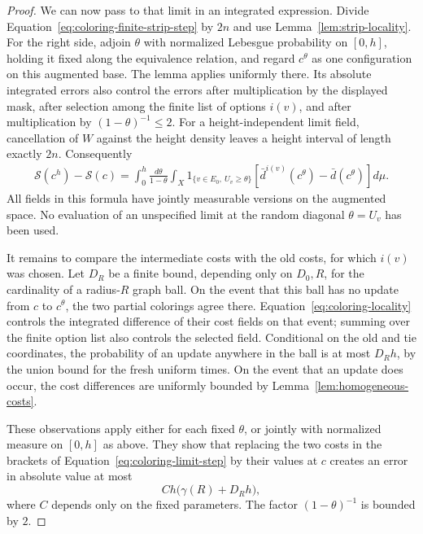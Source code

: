 \begin{proof}
We can now pass to that limit in an integrated expression.  Divide
Equation~\eqref{eq:coloring-finite-strip-step} by $2n$ and use
Lemma~\ref{lem:strip-locality}.  For the right side, adjoin $\theta$ with
normalized Lebesgue probability on $[0,h]$, holding it fixed along the
equivalence relation, and regard $c^\theta$ as one configuration on this
augmented base.  The lemma applies uniformly there.  Its absolute
integrated errors also control the errors after multiplication by the
displayed mask, after selection among the finite list of options
$i(v)$, and after multiplication by $(1-\theta)^{-1}\leq2$.
For a height-independent limit field, cancellation of $W$ against the
height density leaves a height interval of length exactly $2n$.
Consequently
\begin{equation}
 \begin{split}
 \mathcal S(c^h)-\mathcal S(c)
    =\int_0^h\frac{d\theta}{1-\theta}
      \int_X1_{\{v\in E_0,\ U_v\geq\theta\}}
       \left[
        \bar d^{i(v)}(c^\theta)-\bar d(c^\theta)
       \right]d\mu.
 \end{split}
 \label{eq:coloring-limit-step}
\end{equation}
All fields in this formula have jointly measurable versions on the
augmented space.  No evaluation of an unspecified limit at the random
diagonal $\theta=U_v$ has been used.

It remains to compare the intermediate costs with the old costs, for
which $i(v)$ was chosen.  Let $D_R$ be a finite bound, depending only on
$D_0,R$, for the cardinality of a radius-$R$ graph ball.  On the event
that this ball has no update from $c$ to $c^\theta$, the two partial
colorings agree there.  Equation~\eqref{eq:coloring-locality} controls the
integrated difference of their cost fields on that event; summing over
the finite option list also controls the selected field.  Conditional
on the old and tie coordinates, the probability of an update anywhere
in the ball is at most $D_R h$, by the union bound for the fresh uniform
times.  On the event that an update does occur, the cost differences are uniformly bounded
by Lemma~\ref{lem:homogeneous-costs}.

These observations apply either for each fixed $\theta$, or jointly
with normalized measure on $[0,h]$ as above.  They show that replacing
the two costs in the brackets of Equation~\eqref{eq:coloring-limit-step}
by their values at $c$ creates an error in absolute value at most
\begin{equation}
 C h\bigl(\gamma(R)+D_Rh\bigr),
 \label{eq:coloring-step-error}
\end{equation}
where $C$ depends only on the fixed parameters.  The factor
$(1-\theta)^{-1}$ is bounded by $2$.


\end{proof}

